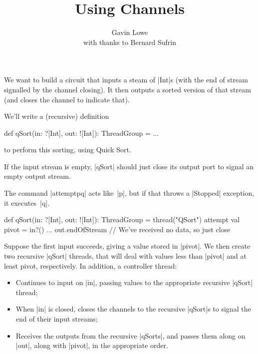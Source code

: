\documentclass[notes,color]{sepslide0}
\title{Using Channels}
\author{Gavin Lowe \\ with thanks to Bernard Sufrin}
\begin{document}
\begin{slide}
  
  \Title

\end{slide}



\begin{slide}

We want to build a circuit that inputs a steam of |Int|s (with the end of
stream signalled by the channel closing).  It then outputs a
sorted version of that stream (and closes the channel to indicate that).

We'll write a (recursive) definition
%
\begin{scala}
  def qSort(in: ?[Int], out: ![Int]): ThreadGroup = ...
\end{scala}
%
to perform this sorting, using Quick Sort.
\end{slide}


\begin{slide}

If the input stream is empty, |qSort| should just close its output port to
signal an empty output stream.

The command |attempt{p}{q}| acts like~|p|, but if that throws a |Stopped|
exception, it executes~|q|.

\begin{scala}
  def qSort(in: ?[Int], out: ![Int]): ThreadGroup = thread("QSort"){
    attempt{
      val pivot = in?()
      ...
    }{
      out.endOfStream // We've received no data, so just close
    }
  }
\end{scala}
\end{slide}


\begin{slide}

Suppose the first input succeeds, giving a value stored in |pivot|.  We then
create two recursive |qSort| threads, that will deal with values less than
|pivot| and at least pivot, respectively.  In addition, a controller thread:
%
\begin{itemize}
\item Continues to input on |in|, passing values to the appropriate recursive
  |qSort| thread;

\item When |in| is closed, closes the channels to the recursive |qSort|s to
  signal the end of their input streams;

\item Receives the outputs from the recursive |qSorts|, and passes them along
  on |out|, along with |pivot|, in the appropriate order.
\end{itemize}
\end{slide}
\end{document}
